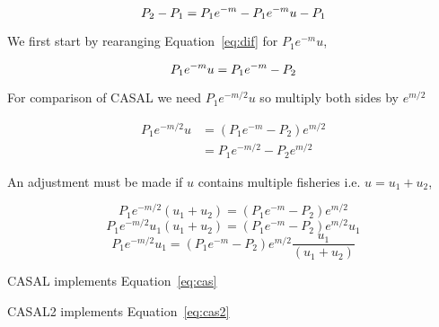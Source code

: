 \documentclass{article}
\begin{document}
		\begin{equation}\label{eq:dif}
		P_2 - P_1 = P_1e^{-m} - P_1e^{-m}u - P_1\\
		\end{equation}
		
	We first start by rearanging Equation~\ref{eq:dif} for $P_1e^{-m}u$,
	  
		\begin{equation}\label{eq:rearrange}
		 P_1e^{-m}u = P_1e^{-m} - P_2\\
		\end{equation}	
		
	For comparison of CASAL we need $P_1e^{-m/2}u$ so multiply both sides by $e^{m/2}$
			    
		\begin{equation}\label{eq:final}
		\begin{split}
		P_1e^{-m/2}u &= (P_1e^{-m} - P_2)e^{m/2}\\
		&= P_1e^{-m/2} - P_2e^{m/2}
		\end{split}
		\end{equation}    
		
	An adjustment must be made if $u$ contains multiple fisheries i.e. $u = u_1 + u_2$,

		$$  P_1e^{-m/2}(u_1 + u_2) = (P_1e^{-m} - P_2)e^{m/2}$$
		$$  P_1e^{-m/2}u_1(u_1 + u_2) = (P_1e^{-m} - P_2)e^{m/2}u_1 $$
		\begin{equation}\label{eq:cas2}
		P_1e^{-m/2}u_1 = (P_1e^{-m} - P_2)e^{m/2}\frac{u_1}{(u_1 + u_2)}
		\end{equation}


CASAL implements Equation~\ref{eq:cas}

CASAL2 implements Equation~\ref{eq:cas2}
	
	
	
\end{document}
